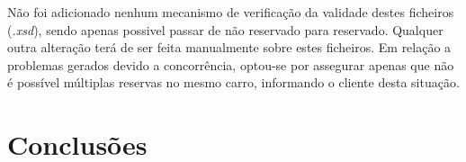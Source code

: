\documentclass[a4paper]{article}
\begin{document}
Não foi adicionado nenhum mecanismo de verificação da validade destes ficheiros (\emph{.xsd}), sendo apenas possivel passar de não reservado para reservado. Qualquer outra alteração terá de ser feita manualmente sobre estes ficheiros.
Em relação a problemas gerados devido a concorrência, optou-se por assegurar apenas que não é possível múltiplas reservas no mesmo carro, informando o cliente desta situação.


\section{Conclusões}
\end{document}
